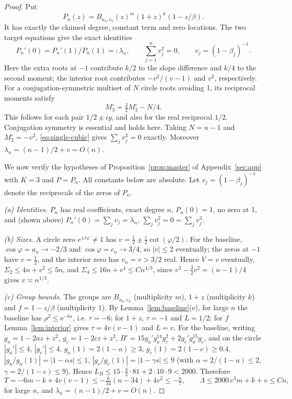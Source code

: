 \documentclass[11pt]{article}
\theoremstyle{remark}\newtheorem{remark}[theorem]{Remark}
\newcommand{\ee}{\mathrm e}
\begin{document}
\begin{proof}
Put
\[
 P_n(z)=B_{a_n,c_n}(z)^m(1+z)^k(1-z/\beta).
\]
It has exactly the claimed degree, constant term and zero locations.
The two target equations give the exact identities
\[
 P_n'(0)=P_n'(1)/P_n(1)=:\lambda_n,
 \qquad \sum_{j=1}^n v_j^2=0,
 \qquad v_j=(1-\beta_j)^{-1}.
\]
Here the extra roots at \(-1\) contribute \(k/2\) to the slope
difference and \(k/4\) to the second moment; the interior root
contributes \(-v^2/(v-1)\) and \(v^2\), respectively.
For a conjugation-symmetric multiset of \(N\) circle roots
avoiding 1, its reciprocal moments satisfy
\begin{equation}\label{eq:circle-third}
 M_3^{\circ}=\tfrac32 M_2^{\circ}-N/4.
\end{equation}
This follows for each pair \(1/2\pm iy\), and also for the real
reciprocal \(1/2\). Conjugation symmetry is essential and holds
here. Taking \(N=n-1\) and \(M_2^{\circ}=-v^2\),
\eqref{eq:single-cubic} gives \(\sum_jv_j^3=0\) exactly.
Moreover \(\lambda_n=(n-1)/2+v=O(n)\).

We now verify the hypotheses of Proposition~\ref{prop:master} of
Appendix~\ref{sec:app} with \(K=3\) and \(P=P_n\). All constants
below are absolute. Let \(v_j=(1-\beta_j)^{-1}\) denote the reciprocals of
the zeros of \(P_n\).

\emph{(a) Identities.} \(P_n\) has real coefficients, exact degree
\(n\), \(P_n(0)=1\), no zero at 1, and (shown above)
\(P_n'(0)=\sum_jv_j=\lambda_n\), \(\sum_jv_j^2=0=\sum_jv_j^3\).

\emph{(b) Sizes.} A circle zero \(e^{\pm i\varphi}\ne1\) has
\(v=\tfrac12\pm\tfrac i2\cot(\varphi/2)\). For the baseline,
\(\cos\varphi=a_n\to-2/3\) and \(\cos\varphi=c_n\to3/4\), so
\(|v|\le2\) eventually; the zeros at \(-1\) have \(v=\tfrac12\), and the
interior zero has \(v_n=v>3/2\) real. Hence \(V=v\) eventually,
\(\Sigma_2\le4n+v^2\le5n\), and \(\Sigma_4\le16n+v^4\le Cn^{4/3}\),
since \(v^3-\tfrac32v^2=(n-1)/4\) gives \(v\asymp n^{1/3}\).

\emph{(c) Group bounds.} The groups are \(B_{a_n,c_n}\) (multiplicity
\(m\)), \(1+z\) (multiplicity \(k\)) and \(f=1-z/\beta\) (multiplicity
\(1\)). By Lemma~\ref{lem:baseline}(e), for large \(n\) the baseline has
\(\rho^2\le\ee^{-6s}\), i.e. \(\tau=-6\); for \(1+z\), \(\tau=-1\) and
\(L=1/2\); for \(f\) Lemma~\ref{lem:interior} gives
\(\tau=4v(v-1)\) and \(L=v\). For the baseline, writing
\(g_a=1-2az+z^2\), \(g_c=1-2cz+z^2\),
\(B'=15g_a'g_a^{14}g_c^2+2g_c'g_a^{15}g_c\), and on the circle
\(|g_a'|\le4\), \(|g_c'|\le4\), \(g_a(1)=2(1-a)\ge3\), \(g_c(1)=2(1-c)\ge0.4\),
\(|g_a/g_a(1)|=|1-\alpha s|\le1\), \(|g_c/g_c(1)|=|1-\gamma s|\le9\)
(with \(\alpha=2/(1-a)\le2\), \(\gamma=2/(1-c)\le9\)). Hence
\(L_B\le15\cdot\tfrac43\cdot81+2\cdot10\cdot9<2000\). Therefore
\[
 T=-6m-k+4v(v-1)\le-\tfrac{6}{34}(n-34)+4v^2\le-\tfrac n7,
 \qquad \Lambda\le2000\,e^{3}m+k+v\le Cn,
\]
for large \(n\), and \(\lambda_n=(n-1)/2+v=O(n)\).


\end{proof}
\end{document}

